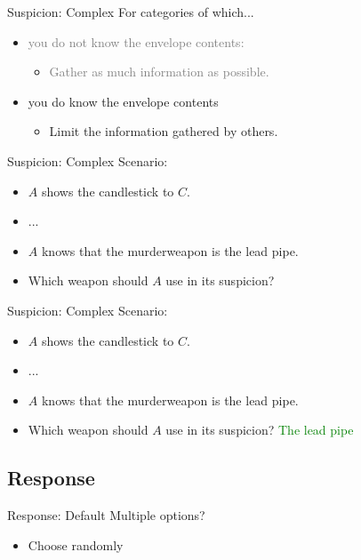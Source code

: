 
\begin{frame}{Suspicion: Complex}
  For categories of which...
  \begin{itemize}
   \item \textcolor{gray}{you do not know the envelope contents:}
      \begin{itemize}
      \item \textcolor{gray}{Gather as much information as possible.}
      \end{itemize}
   \item you do know the envelope contents
      \begin{itemize}
      \item Limit the information gathered by others.
      \end{itemize}
  \end{itemize}

\end{frame}

\begin{frame}{Suspicion: Complex}
  Scenario: 
  \begin{itemize}
    \item $A$ shows the candlestick to $C$.
    \item ...
    \item $A$ knows that the murderweapon is the lead pipe.
    \item Which weapon should $A$ use in its suspicion?
  \end{itemize}
\end{frame}


\begin{frame}{Suspicion: Complex}
  Scenario:
  \begin{itemize}
    \item $A$ shows the candlestick to $C$.
    \item ...
    \item $A$ knows that the murderweapon is the lead pipe.
    \item Which weapon should $A$ use in its suspicion? \textcolor{green}{The lead pipe}
  \end{itemize}
\end{frame}


\subsection{Response}
\begin{frame}{Response: Default}
Multiple options?
  \begin{itemize}
  \item Choose randomly
  \end{itemize}
\end{frame}

